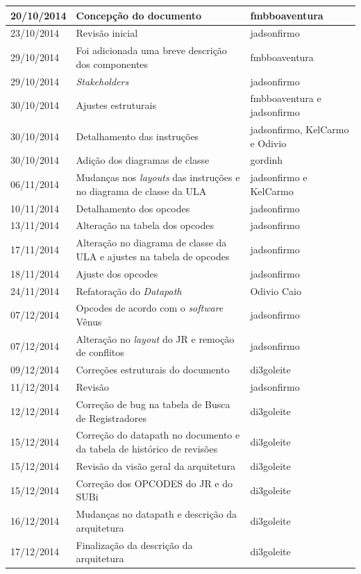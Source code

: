 \documentclass{report}
\begin{document}
\begin{center}
\begin{longtable}[pos]{|m{2cm} | m{8cm} | m{4cm}|}
		20/10/2014 & Concepção do documento & fmbboaventura \\ \hline
		23/10/2014 & Revisão inicial & jadsonfirmo \\ \hline
		29/10/2014 & Foi adicionada uma breve descrição dos componentes & fmbboaventura \\ \hline       
		29/10/2014 & \textit{Stakeholders} & jadsonfirmo \\ \hline
		30/10/2014 & Ajustes estruturais & fmbboaventura e jadsonfirmo \\ \hline
		30/10/2014 & Detalhamento das instruções & jadsonfirmo, KelCarmo e Odivio \\ \hline
		30/10/2014 & Adição dos diagramas de classe & gordinh \\ \hline
		06/11/2014 & Mudanças nos \textit{layouts} das instruções e no diagrama de classe da ULA & jadsonfirmo e KelCarmo \\ \hline
		10/11/2014 & Detalhamento dos opcodes & jadsonfirmo \\ \hline
		13/11/2014 & Alteração na tabela dos opcodes & jadsonfirmo \\ \hline
		17/11/2014 & Alteração no diagrama de classe da ULA e ajustes na tabela de opcodes & jadsonfirmo \\ \hline
		18/11/2014 & Ajuste dos opcodes & jadsonfirmo \\ \hline
		24/11/2014 & Refatoração do \textit{Datapath} & Odivio Caio \\ \hline
		07/12/2014 & Opcodes de acordo com o \textit{software} Vênus & jadsonfirmo \\ \hline
		07/12/2014 & Alteração no \textit{layout} do JR e remoção de conflitos & jadsonfirmo \\ \hline
		09/12/2014 & Correções estruturais do documento & di3goleite \\ \hline
		11/12/2014 & Revisão & jadsonfirmo \\ \hline
		12/12/2014 & Correção de bug na tabela de Busca de Registradores & di3goleite \\ \hline
		15/12/2014 & Correção do datapath no documento e da tabela de histórico de revisões & di3goleite \\ \hline
		15/12/2014 & Revisão da visão geral da arquitetura & di3goleite \\ \hline
		15/12/2014 & Correção dos OPCODES do JR e do SUBi & di3goleite \\ \hline
		16/12/2014 & Mudanças no datapath e descrição da arquitetura & di3goleite \\ \hline
		17/12/2014 & Finalização da descrição da arquitetura & di3goleite \\ \hline
	\end{longtable}
\end{center}
\end{document}
